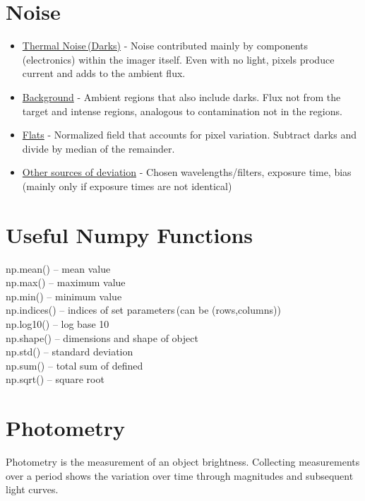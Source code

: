 \documentclass[onecolumn]{aastex6}
\begin{document}

\section{Noise}
\begin{itemize}
\item{\underline{Thermal Noise\,(Darks)} - Noise contributed mainly by components\,(electronics) within the imager itself. Even with no light, pixels produce current and adds to the ambient flux.}
\item{\underline{Background} - Ambient regions that also include darks. Flux not from the target and intense regions, analogous to contamination not in the regions.}
\item{\underline{Flats} - Normalized field that accounts for pixel variation. Subtract darks and divide by median of the remainder.}
\item{\underline{Other sources of deviation} - Chosen wavelengths/filters, exposure time, bias\,(mainly only if exposure times are not identical)}
\end{itemize}

\section{Useful Numpy Functions}
\noindent np.mean() -- mean value\\
np.max() -- maximum value\\
np.min() -- minimum value\\
np.indices() -- indices of set parameters\,(can be (rows,columns))\\
np.log10() -- log base 10\\
np.shape() -- dimensions and shape of object\\
np.std() -- standard deviation\\
np.sum() -- total sum of defined\\
np.sqrt() -- square root


\section{Photometry}
Photometry is the measurement of an object brightness. Collecting measurements over a period shows the variation over time through magnitudes and subsequent light curves.
\end{document}
